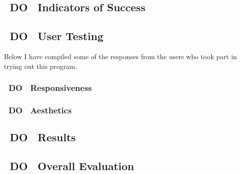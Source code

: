 \documentclass[11pt]{article}
\begin{document}
\subsection{~DO~ Indicators of Success}

\subsection{~DO~ User Testing}



Below I have compiled some of the responses from the users who took part in
trying out this program.
\subsubsection{~DO~ Responsiveness}

\subsubsection{~DO~ Aesthetics}

\subsection{~DO~ Results}

\subsection{~DO~ Overall Evaluation}
\end{document}
